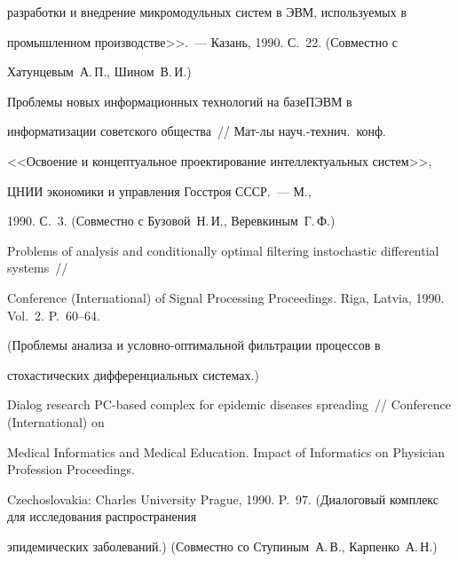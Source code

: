 разработки и внедрение микромодульных систем в ЭВМ, используемых в


промышленном производстве>>.~--- Казань, 1990. С.~22. (Совместно с


Хатунцевым~А.\,П., Шином~В.\,И.)





 Проблемы новых информационных технологий на базе\linebreak ПЭВМ в


информатизации советского общества~// Мат-лы науч.-технич.\ конф.\


<<Освоение и концептуальное проектирование интеллектуальных систем>>,


ЦНИИ экономики и управления Госстроя СССР.~--- М.,


1990. С.~3. (Совместно с Бузовой~Н.\,И., Веревкиным~Г.\,Ф.)





Problems of analysis and conditionally optimal filtering in\linebreak stochastic differential systems~//


Conference (International) of Signal Processing Proceedings. Riga, Latvia, 1990. Vol.~2. P.~60--64.


(Проблемы анализа и условно-оптимальной фильтрации процессов в


стохастических дифференциальных системах.)














Dialog research PC-based complex for epidemic diseases spreading~// Conference (International) on


Medical Informatics and Medical Education. Impact of Informatics on Physician Profession Proceedings.


Czechoslovakia: Charles University Prague, 1990. P.~97. (Диалоговый комплекс для исследования распространения


эпидемических заболеваний.) (Совместно со Ступиным~А.\,В., Карпенко~А.\,Н.)





